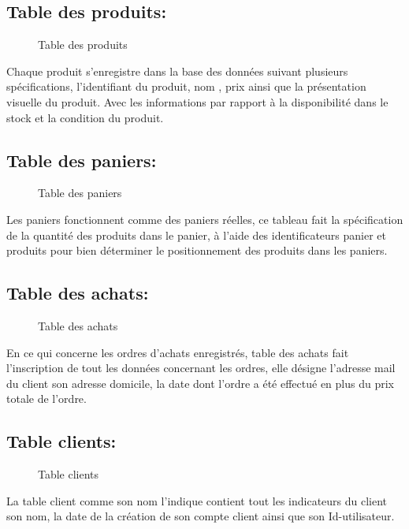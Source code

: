 \documentclass[a4paper]{report}
\begin{document}
\begin{doublespace}
	\subsection{ Table des produits: }
	\begin{figure}[H]
		
		\caption{Table des produits}
	\end{figure}
	Chaque produit s'enregistre dans la base des données
	suivant plusieurs spécifications, l'identifiant du produit, nom , prix ainsi
	que la présentation visuelle du produit. Avec les informations par rapport à la
	disponibilité dans le stock et la condition du produit.
	\subsection{ Table des paniers: }
	\begin{figure}[H]
		
		\caption{Table des paniers}
	\end{figure}
	Les paniers fonctionnent comme des paniers réelles, ce
	tableau fait la spécification de la quantité des produits dans le panier,  à
	l'aide des identificateurs panier et produits pour bien déterminer le
	positionnement des produits dans les paniers.
	\subsection{ Table des achats: }
	\begin{figure}[H]
		
		\caption{Table des achats}
	\end{figure}
	En ce qui concerne les ordres d'achats enregistrés,
	table  des achats fait l'inscription de tout les données concernant les ordres,
	elle désigne l'adresse mail du client son adresse domicile, la	date dont
	l'ordre a été effectué en plus du prix totale de l'ordre.
	\subsection{ Table clients: }
	\begin{figure}[H]
		
		\caption{Table clients}
	\end{figure}
	La table client comme son nom l'indique contient tout
	les indicateurs du client son nom, la date de la création de son compte client
	ainsi que son Id-utilisateur.
	

\end{doublespace}
\end{document}
